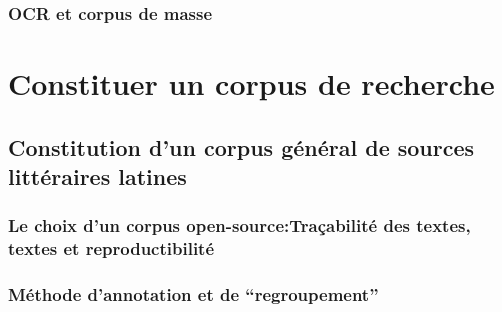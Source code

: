 


\subsubsection{OCR et corpus de masse}




\section{Constituer un corpus de recherche}

\subsection{Constitution d’un corpus général de sources littéraires latines}

\subsubsection{Le choix d’un corpus open-source:Traçabilité des textes, textes et reproductibilité}


\subsubsection{Méthode d’annotation et de “regroupement”}

